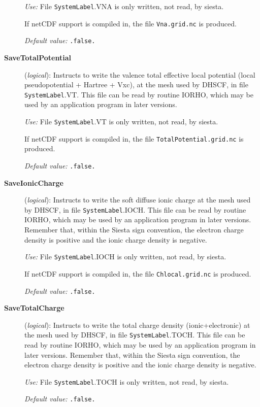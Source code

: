 \documentclass[11pt]{article}
\begin{document}
\begin{description}
{\it Use:} File {\tt SystemLabel}.VNA is only written, not read, by siesta.

If netCDF support is compiled in, the file {\tt Vna.grid.nc} is produced.

{\it Default value:} {\tt .false.}


\item[{\bf SaveTotalPotential}] ({\it logical}):
Instructs to write the valence total effective local potential
(local pseudopotential + Hartree + Vxc), at the
mesh used by DHSCF,
in file {\tt SystemLabel}.VT. This file can be read by routine IORHO,
which may be used by an application program in later versions.

{\it Use:} File {\tt SystemLabel}.VT is only written, not read, by siesta.

If netCDF support is compiled in, the file {\tt TotalPotential.grid.nc} is produced.

{\it Default value:} {\tt .false.}


\item[{\bf SaveIonicCharge}] ({\it logical}):
Instructs to write the soft diffuse ionic charge at the
mesh used by DHSCF,
in file {\tt SystemLabel}.IOCH. This file can be read by routine IORHO,
which may be used by an application program in later versions.
Remember that, within the {\sc Siesta} sign convention, the electron charge
density is positive and the ionic charge density is negative.


{\it Use:} File {\tt SystemLabel}.IOCH is only written, not read, by siesta.

If netCDF support is compiled in, the file {\tt Chlocal.grid.nc} is produced.

{\it Default value:} {\tt .false.}

\item[{\bf SaveTotalCharge}] ({\it logical}):
Instructs to write the total charge density (ionic+electronic) at the
mesh used by DHSCF,
in file {\tt SystemLabel}.TOCH. This file can be read by routine IORHO,
which may be used by an application program in later versions.
Remember that, within the {\sc Siesta} sign convention, the electron charge
density is positive and the ionic charge density is negative.

{\it Use:} File {\tt SystemLabel}.TOCH is only written, not read, by siesta.

{\it Default value:} {\tt .false.}

\end{description}
\end{document}
